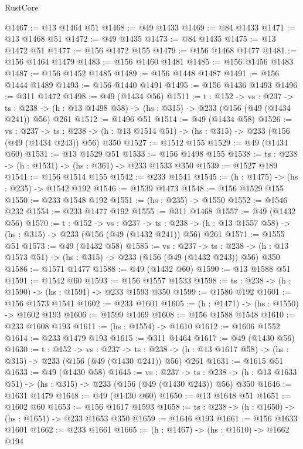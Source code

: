 \begin{lexlean}{RustCore}
\begin{coremodule}
@1467 := @13 @1464 @51
@1468 := @49 @1433
@1469 := @84 @1433
@1471 := @13 @1468 @51
@1472 := @49 @1435
@1473 := @84 @1435
@1475 := @13 @1472 @51
@1477 := @156 @1472 @155
@1479 := @156 @1468 @1477
@1481 := @156 @1464 @1479
@1483 := @156 @1460 @1481
@1485 := @156 @1456 @1483
@1487 := @156 @1452 @1485
@1489 := @156 @1448 @1487
@1491 := @156 @1444 @1489
@1493 := @156 @1440 @1491
@1495 := @156 @1436 @1493
@1496 := @311 @1472
@1498 := @49 (@1434 @56)
@1511 := {t : @152} ->
  {vs : @237} ->
  {ts : @238} -> (h : @13 @1498 @58) -> (hs : @315) -> @233 (@156 (@49 (@1434 @241)) @56) @261
@1512 := @1496 @51
@1514 := @49 (@1434 @58)
@1526 := {vs : @237} ->
  {ts : @238} -> (h : @13 @1514 @51) -> (hs : @315) -> @233 (@156 (@49 (@1434 @243)) @56) @350
@1527 := @1512 @155
@1529 := @49 (@1434 @60)
@1531 := @13 @1529 @51
@1533 := @156 @1498 @155
@1538 := {ts : @238} -> (h : @1531) -> (hs : @361) -> @233 @1533 @350
@1539 := @1527 @189
@1541 := @156 @1514 @155
@1542 := @233 @1541
@1545 := (h : @1475) -> (hs : @235) -> @1542 @192
@1546 := @1539 @1473
@1548 := @156 @1529 @155
@1550 := @233 @1548 @192
@1551 := (hs : @235) -> @1550
@1552 := @1546 @232
@1554 := @233 @1477 @192
@1555 := @311 @1468
@1557 := @49 (@1432 @56)
@1570 := {t : @152} ->
  {vs : @237} ->
  {ts : @238} -> (h : @13 @1557 @58) -> (hs : @315) -> @233 (@156 (@49 (@1432 @241)) @56) @261
@1571 := @1555 @51
@1573 := @49 (@1432 @58)
@1585 := {vs : @237} ->
  {ts : @238} -> (h : @13 @1573 @51) -> (hs : @315) -> @233 (@156 (@49 (@1432 @243)) @56) @350
@1586 := @1571 @1477
@1588 := @49 (@1432 @60)
@1590 := @13 @1588 @51
@1591 := @1542 @60
@1593 := @156 @1557 @1533
@1598 := {ts : @238} -> (h : @1590) -> (hs : @1591) -> @233 @1593 @350
@1599 := @1586 @192
@1601 := @156 @1573 @1541
@1602 := @233 @1601
@1605 := (h : @1471) -> (hs : @1550) -> @1602 @193
@1606 := @1599 @1469
@1608 := @156 @1588 @1548
@1610 := @233 @1608 @193
@1611 := (hs : @1554) -> @1610
@1612 := @1606 @1552
@1614 := @233 @1479 @193
@1615 := @311 @1464
@1617 := @49 (@1430 @56)
@1630 := {t : @152} ->
  {vs : @237} ->
  {ts : @238} -> (h : @13 @1617 @58) -> (hs : @315) -> @233 (@156 (@49 (@1430 @241)) @56) @261
@1631 := @1615 @51
@1633 := @49 (@1430 @58)
@1645 := {vs : @237} ->
  {ts : @238} -> (h : @13 @1633 @51) -> (hs : @315) -> @233 (@156 (@49 (@1430 @243)) @56) @350
@1646 := @1631 @1479
@1648 := @49 (@1430 @60)
@1650 := @13 @1648 @51
@1651 := @1602 @60
@1653 := @156 @1617 @1593
@1658 := {ts : @238} -> (h : @1650) -> (hs : @1651) -> @233 @1653 @350
@1659 := @1646 @193
@1661 := @156 @1633 @1601
@1662 := @233 @1661
@1665 := (h : @1467) -> (hs : @1610) -> @1662 @194

\end{coremodule}
\end{lexlean}
